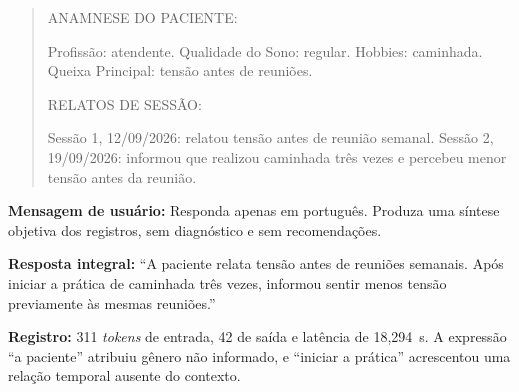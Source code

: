 \begin{apendicesenv}
\begin{quote}
ANAMNESE DO PACIENTE:

Profissão: atendente. Qualidade do Sono: regular. Hobbies: caminhada. Queixa Principal: tensão antes de reuniões.

RELATOS DE SESSÃO:

Sessão 1, 12/09/2026: relatou tensão antes de reunião semanal. Sessão 2, 19/09/2026: informou que realizou caminhada três vezes e percebeu menor tensão antes da reunião.
\end{quote}

\textbf{Mensagem de usuário:} Responda apenas em português. Produza uma síntese objetiva dos registros, sem diagnóstico e sem recomendações.

\textbf{Resposta integral:} ``A paciente relata tensão antes de reuniões semanais. Após iniciar a prática de caminhada três vezes, informou sentir menos tensão previamente às mesmas reuniões.''

\textbf{Registro:} 311 \textit{tokens} de entrada, 42 de saída e latência de 18,294~s. A expressão ``a paciente'' atribuiu gênero não informado, e ``iniciar a prática'' acrescentou uma relação temporal ausente do contexto.

\end{apendicesenv}
